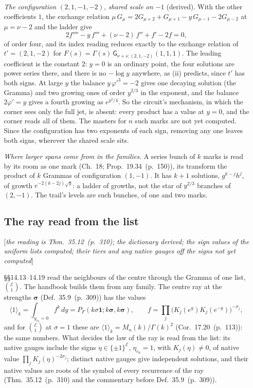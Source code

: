\documentclass[11pt]{article}
\newcommand{\cE}{\mathcal E}
\newcommand{\one}{\mathbf 1}
\newcommand{\sG}{\mathsf G}
\newcommand{\status}[1]{\hfill{\small[\textit{#1}]}}
\newcommand{\hb}[2]{#1~(p.~#2)}   %
\theoremstyle{plain}
\theoremstyle{remark}
\begin{document}
\emph{The configuration $(2,1,-1,-2)$, shared scale on $-1$} (derived). With the other coefficients $1$, the exchange relation $\mu\,G_\mu=2G_{\mu+2}+G_{\mu+1}-y\,G_{\mu-1}-2G_{\mu-2}$ at $\mu=\nu-2$ and the ladder give
\[
2f''''-y\,f'''+(\nu-2)\,f''+f'-2f=0 ,
\]
of order four, and its index reading reduces exactly to the exchange relation of $t'=(2,1,-2)$ for $F(s)=\Gamma(s)\,\sG_{\nu+s;(2,1,-2)}(1,1,1)$. The leading coefficient is the constant $2$: $y=0$ is an ordinary point, the four solutions are power series there, and there is no $-\log y$ anywhere, as (ii) predicts, since $t'$ has both signs. At large $y$ the balance $y\,\varphi'^3=-2$ gives one decaying solution (the Gramma) and two growing ones of order $y^{2/3}$ in the exponent, and the balance $2\varphi'=y$ gives a fourth growing as $e^{y^2/4}$. So the circuit's mechanism, in which the corner sees only the full jet, is absent: every product has a value at $y=0$, and the corner reads all of them. The masters for $n$ such marks are not yet computed. Since the configuration has two exponents of each sign, removing any one leaves both signs, wherever the shared scale sits.

\emph{Where larger spans come from in the families.} A series bunch of $k$ marks is read by its room as one mark (Ch.~18; Prop.~\hb{19.34}{150}), its transform the product of $k$ Grammas of configuration $(1,-1)$. It has $k+1$ solutions, $g^{k-j}h^j$, of growth $e^{-2(k-2j)\sqrt y}$: a ladder of growths, not the star of $y^{2/3}$ branches of $(2,-1)$. The trail's levels are such bunches, of one and two marks.

\subsection{The ray read from the list}\status{the reading is Thm.~\hb{35.12}{310}; the dictionary derived; the sign values of the uniform lists computed; their tiers and any native gauges off the signs not yet computed}

\S\S14.13--14.19 read the neighbours of the centre through the Gramma of one list, $\binom{\cE}1$. The handbook builds them from any family. The centre ray at the strengths $\boldsymbol\sigma$ (Def.~\hb{35.9}{309}) has the values
\[
\langle1\rangle_k=\int_{y_{e_0}=0}f^k\,dy=P_F(k\sigma\one;k\boldsymbol\sigma,k\boldsymbol\sigma),\qquad f=\prod_j\big(K_j(e^y)K_j(e^{-y})\big)^{-\sigma_j},
\]
and for $\binom{\cE}1$ at $\sigma=1$ these are $\langle1\rangle_k=M_n(k)/\Gamma(k)^2$ (Cor.~\hb{17.20}{113}): the same numbers. What decides the law of the ray is read from the list: its native gauges include the signs $\eta\in\{\pm1\}^{\cE}$, $\eta_{e_0}=1$, with $K_j(\eta)\neq0$, of native value $\prod_jK_j(\eta)^{-2\sigma_j}$; distinct native gauges give independent solutions, and their native values are roots of the symbol of every recurrence of the ray (Thm.~\hb{35.12}{310} and the commentary before Def.~\hb{35.9}{309}).
\end{document}
